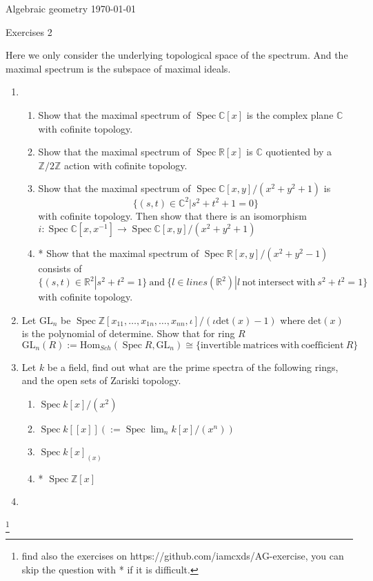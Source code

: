 \documentclass[a4paper,11pt]{article}
\def\bb#1{\mathbb{#1}}
\def\bZ{\mathbb{Z}}
\def\Zmd#1{\bZ/#1\bZ}
\def\mrm#1{\mathrm{#1}}
\def\Hom{\mathrm{Hom}}
\DeclareMathOperator{\Spec}{Spec}
\begin{document}
{\small Algebraic geometry \hfill \today \\}
\begin{center}
\Huge Exercises 2
\end{center}

\vskip0.6cm
Here we only consider the underlying topological space of the spectrum. And the maximal spectrum is the subspace of maximal ideals.
\begin{enumerate}[1.]
\item 
\begin{enumerate}
    \item Show that the maximal spectrum of $\Spec\bb{C}[x]$ is the complex plane $\bb{C}$ with cofinite topology.
    \item Show that the maximal spectrum of $\Spec \bb{R}[x]$ is $\bb{C}$ quotiented by a $\Zmd{2}$ action with cofinite topology.
    \item Show that the maximal spectrum of $\Spec \bb{C}[x,y]/(x^2+y^2+1)$ is 
    \[\{(s,t)\in \bb{C}^2|s^2+t^2+1=0\}\] with cofinite topology. Then show that there is an isomorphism $i: \Spec \bb{C}[x,x^{-1}] \to \Spec \bb{C}[x,y]/(x^2+y^2+1)$
    \item* Show that the maximal spectrum of $\Spec \bb{R}[x,y]/(x^2+y^2-1)$ consists of 
    \[\{(s,t)\in \bb{R}^2|s^2+t^2=1\} \mrm{ \ and\ } \{ l\in lines(\bb{R}^2)|l\mrm{ \ not \ intersect\ with\ } s^2+t^2=1\} \] 
    with cofinite topology.
    
\end{enumerate}
\item Let $\mrm{GL}_n$ be $ \Spec \bZ[x_{11},\ldots,x_{1n},\ldots,x_{nn},\iota]/(\iota\mrm{det}(x)-1) $ where $\mrm{det}(x)$ is the polynomial of determine. Show that for ring $R$ \[\mrm{GL}_n(R):=\Hom_{Sch}(\Spec R, \mrm{GL}_n)\cong 
\{\mrm{ invertible\ matrices\ with\ coefficient\ } R\} \]
\item Let $k$ be a field, find out what are the prime spectra of the following rings, and the open sets of Zariski topology.
\begin{enumerate}
    \item  $\Spec k[x]/(x^2)$
    \item  $\Spec k[[x]](:=\Spec \lim_n k[x]/(x^n))$
    \item  $\Spec k[x]_{(x)}$
    \item*  $\Spec \bZ[x]$
\end{enumerate}
\item 




\end{enumerate}
\footnote{find also the exercises on https://github.com/iamcxds/AG-exercise, you can skip the question with * if it is difficult.}
\end{document}
